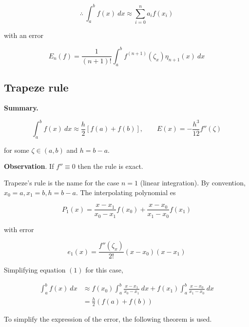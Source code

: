 \documentclass[12pt]{article}
\theoremstyle{definition}
\begin{document}
\begin{equation}
    \therefore ~ \int_a^b f(x) ~ dx \approx \sum_{i=0}^n a_i f(x_i)
\end{equation}

with an error 

\begin{equation}
    E_n(f) = \frac{1}{(n+1)!}\int_a^b f^{(n+1)}(\zeta_x) \eta_{n+1}(x) ~ dx
\end{equation}

\subsection{Trapeze rule}

\begin{shaded}
    \textbf{Summary.} 

    \begin{equation*}
        \int_a^b f(x) ~ dx \approx \frac{h}{2}\left[ f(a) + f(b) \right], \qquad
        E(x) = -\frac{h^3}{12} f''(\zeta)
    \end{equation*}

    for some $\zeta \in (a, b)$ and $h = b-a$.

    \textbf{Observation}. If $f'' \equiv 0$ then the rule is exact.
\end{shaded}

Trapeze's rule is the name for the case $n = 1$ (linear integration). By
convention, $x_0 = a, x_1 = b, h = b- a$. The interpolating polynomial es 

\begin{equation*}
    P_1(x) = \frac{x-x_1}{x_0 - x_1} f(x_0) + \frac{x-x_0}{x_1 - x_0} f(x_1)
\end{equation*}

with error 

\begin{equation*}
    e_1(x) = \frac{f''(\zeta_x)}{2!}(x-x_0)(x-x_1)
\end{equation*}

Simplifying equation $(1)$ for this case, 

\begin{align*}
    \int_a^b f(x) ~ dx &\approx f(x_0)\int_a^b \frac{x-x_1}{x_0 - x_1} ~ dx +
    f(x_1) \int_a^b \frac{x-x_0}{x_1 - x_0} ~ dx \\ 
    &= \frac{h}{2}\left( f(a) + f(b) \right) 
\end{align*}

To simplify the expression of the error, the following theorem is used. 
\end{document}
